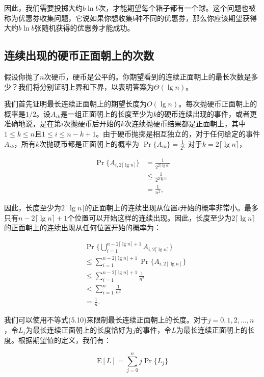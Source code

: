 \documentclass[lang=cn,newtx,10pt,scheme=chinese]{elegantbook}
\begin{document}
因此，我们需要投掷大约$b\ln b$次，才能期望每个箱子都有一个球。这个问题也被称为优惠券收集问题，它说如果你想收集$b$种不同的优惠券，那么你应该期望获得大约$b\ln b$张随机获得的优惠券才能成功。

\subsection{连续出现的硬币正面朝上的次数}

假设你抛了$n$次硬币，硬币是公平的。你期望看到的连续正面朝上的最长次数是多少？我们将分别证明上界和下界，以表明答案为$\Theta(\lg n)$。

我们首先证明最长连续正面朝上的期望长度为$O(\lg n)$。每次抛硬币正面朝上的概率是$1/2$。设$A_{ik}$是一组正面朝上的长度至少为$k$的硬币连续出现的事件，或者更准确地说，是在第$i$次抛硬币后开始的$k$次连续抛硬币结果都是正面朝上，其中$1\leq k\leq n$且$1\leq i\leq n-k+1$。由于硬币抛掷是相互独立的，对于任何给定的事件$A_{ik}$，所有$k$次抛硬币都是正面朝上的概率为
$\operatorname{Pr}\{A_{ik}\}=\frac{1}{2^k}$
对于$k=2\lceil\lg n\rceil$，

$$
\begin{aligned}
\operatorname{Pr}\{A_{i, 2\lceil\lg n\rceil}\} & =\frac{1}{2^{2\lceil\lg n\rceil}} \\
& \leq \frac{1}{2^{2 \lg n}} \\
& =\frac{1}{n^2},
\end{aligned}
$$

因此，长度至少为$2\lceil\lg n\rceil$的正面朝上的连续出现从位置$i$开始的概率非常小。最多只有$n-2\lceil\lg n\rceil+1$个位置可以开始这样的连续出现。因此，长度至少为$2\lceil\lg n\rceil$的正面朝上的连续出现从任何位置开始的概率为：

$$
\begin{aligned}
& \operatorname{Pr}\{\bigcup_{i=1}^{n-2\lceil\lg n\rceil+1} A_{i, 2\lceil\lg n\rceil}\} \\
& \leq \sum_{i=1}^{n-2\lceil\lg n\rceil+1} \operatorname{Pr}\{A_{i, 2[\lg n]}\} \\
& \leq \sum_{i=1}^{n-2\lceil\lg n\rceil+1} \frac{1}{n^2} \\
&<\sum_{i=1}^n \frac{1}{n^2} \\
&=\frac{1}{n} .
\end{aligned}
$$

我们可以使用不等式(5.10)来限制最长连续正面朝上的长度。对于$j=0,1,2,\ldots,n$，令$L_j$为最长连续正面朝上的长度恰好为$j$的事件，令$L$为最长连续正面朝上的长度。根据期望值的定义，我们有：

$$
\mathrm{E}[L]=\sum_{j=0}^n j \operatorname{Pr}\{L_j\}
$$
\end{document}
